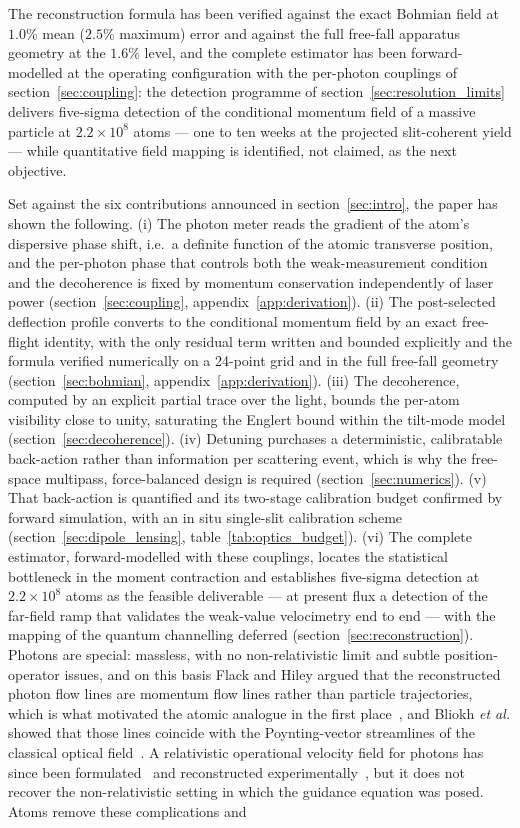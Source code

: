\documentclass[11pt,a4paper]{article}
\begin{document}
The reconstruction formula has been verified against the exact Bohmian field at $1.0\%$ mean ($2.5\%$ maximum) error and against the full free-fall apparatus geometry at the $1.6\%$ level, and the complete estimator has been forward-modelled at the operating configuration with the per-photon couplings of section~\ref{sec:coupling}: the detection programme of section~\ref{sec:resolution_limits} delivers five-sigma detection of the conditional momentum field of a massive particle at $2.2\times 10^8$ atoms --- one to ten weeks at the projected slit-coherent yield --- while quantitative field mapping is identified, not claimed, as the next objective.

Set against the six contributions announced in section~\ref{sec:intro}, the paper has shown the following. (i) The photon meter reads the gradient of the atom's dispersive phase shift, i.e.\ a definite function of the atomic transverse position, and the per-photon phase that controls both the weak-measurement condition and the decoherence is fixed by momentum conservation independently of laser power (section~\ref{sec:coupling}, appendix~\ref{app:derivation}). (ii) The post-selected deflection profile converts to the conditional momentum field by an exact free-flight identity, with the only residual term written and bounded explicitly and the formula verified numerically on a 24-point grid and in the full free-fall geometry (section~\ref{sec:bohmian}, appendix~\ref{app:derivation}). (iii) The decoherence, computed by an explicit partial trace over the light, bounds the per-atom visibility close to unity, saturating the Englert bound within the tilt-mode model (section~\ref{sec:decoherence}). (iv) Detuning purchases a deterministic, calibratable back-action rather than information per scattering event, which is why the free-space multipass, force-balanced design is required (section~\ref{sec:numerics}). (v) That back-action is quantified and its two-stage calibration budget confirmed by forward simulation, with an in situ single-slit calibration scheme (section~\ref{sec:dipole_lensing}, table~\ref{tab:optics_budget}). (vi) The complete estimator, forward-modelled with these couplings, locates the statistical bottleneck in the moment contraction and establishes five-sigma detection at $2.2\times 10^8$ atoms as the feasible deliverable --- at present flux a detection of the far-field ramp that validates the weak-value velocimetry end to end --- with the mapping of the quantum channelling deferred (section~\ref{sec:reconstruction}). Photons are special: massless, with no non-relativistic limit and subtle position-operator issues, and on this basis Flack and Hiley argued that the reconstructed photon flow lines are momentum flow lines rather than particle trajectories, which is what motivated the atomic analogue in the first place~\cite{FlackHiley2014}, and Bliokh \emph{et al.} showed that those lines coincide with the Poynting-vector streamlines of the classical optical field~\cite{Bliokh2013}. A relativistic operational velocity field for photons has since been formulated~\cite{Foo2022} and reconstructed experimentally~\cite{Wang2025}, but it does not recover the non-relativistic setting in which the guidance equation was posed. Atoms remove these complications and 
\end{document}
